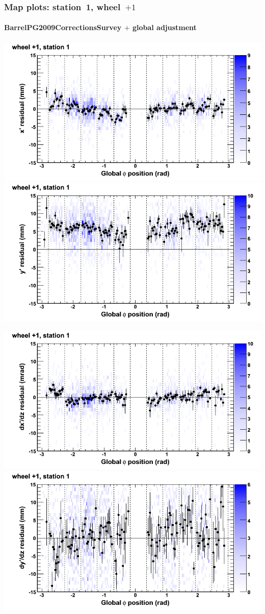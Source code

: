 \documentclass[compress]{beamer}
\begin{document}
\begin{frame}
\frametitle{Map plots: station~1, wheel~$+1$}
\framesubtitle{BarrelPG2009CorrectionsSurvey $+$ global adjustment}
\includegraphics[width=0.5\linewidth]{mapplots_re01/DTvsphi_st1whD_x.png}
\includegraphics[width=0.5\linewidth]{mapplots_re01/DTvsphi_st1whD_y.png}

\includegraphics[width=0.5\linewidth]{mapplots_re01/DTvsphi_st1whD_dxdz.png}
\includegraphics[width=0.5\linewidth]{mapplots_re01/DTvsphi_st1whD_dydz.png}
\end{frame}
\end{document}
